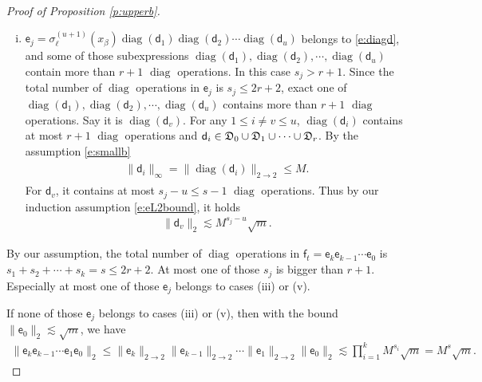 \documentclass{article}
\numberwithin{equation}{section}
\newcommand{\fc}{{\mathtt c}}
\newcommand{\fD}{{\frak D}}
\newcommand{\sfe}{{\mathsf e}}
\newcommand{\sfd}{{\mathsf d}}
\newcommand{\sff}{{\mathsf f}}
\DeclareMathOperator{\diag}{diag}
\renewcommand{\leq}{\leqslant}
\newcommand{\1}{\mathds{1}}
\theoremstyle{plain} %
\begin{document}
\begin{proof}[Proof of Proposition \ref{p:upperb}]
\begin{enumerate}[(i)]
\item  $\sfe_j=\sigma_\ell^{(u+1)}(x_\beta)\diag(\sfd_1)\diag(\sfd_2)\cdots \diag(\sfd_u)$ belongs to \eqref{e:diagd},  and some of those subexpressions $\diag(\sfd_1), \diag(\sfd_2), \cdots, \diag(\sfd_u)$ contain more than $r+1$ $\diag$ operations. In this case $s_j> r+1$. Since the total number of $\diag$ operations in $\sfe_j$ is $s_j\leq 2r+2$, exact one of $\diag(\sfd_1), \diag(\sfd_2), \cdots, \diag(\sfd_u)$ contains more than $r+1$ $\diag$ operations. Say it is $\diag(\sfd_v)$. For any $1\leq i\neq v\leq u$, $\diag(\sfd_i)$ contains at most $r+1$ $\diag$ operations and $\sfd_i\in \fD_{0}\cup\fD_{1}\cup \cdots \cup\fD_{r}$. By the assumption \eqref{e:smallb} 
\begin{align}\begin{split}\label{e:oterm}
\|\sfd_i\|_\infty=\|\diag(\sfd_i)\|_{2\rightarrow 2}\leq M.
\end{split}\end{align}
For $\sfd_v$, it contains at most  $s_j-u\leq s-1$ $\diag$ operations. Thus by our induction assumption \eqref{e:eL2bound}, it holds
\begin{align}\label{e:vterm}
\|\sfd_v\|_{2}\lesssim  M^{s_j-u}\sqrt m.
\end{align}




\end{enumerate}


By our assumption, the total number of $\diag$ operations in $\sff_t=\sfe_k\sfe_{k-1}\cdots\sfe_0$ is  $s_1+s_2+\cdots+s_k=s\leq 2r+2$. At most one of those $s_j$ is bigger than $r+1$. Especially at most one of those $\sfe_j$ belongs to cases (iii) or (v). 

If none of those $\sfe_j$ belongs to cases (iii) or (v), then with the bound $\|\sfe_0\|_2\lesssim \sqrt m$, we have 
\begin{align}\label{e:cc1}
\|\sfe_k\sfe_{k-1}\cdots\sfe_1\sfe_0\|_2
\leq \|\sfe_k\|_{2\rightarrow 2}\|\sfe_{k-1}\|_{2\rightarrow 2}\cdots\|\sfe_1\|_{2\rightarrow 2}\|\sfe_0\|_2
\lesssim \prod_{i=1}^k M^{s_i} \sqrt m=M^{s}\sqrt m.
\end{align}


\end{proof}
\end{document}
